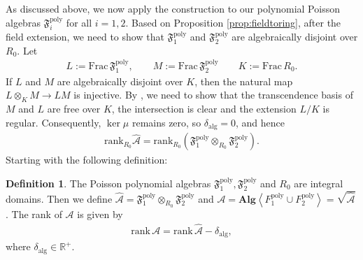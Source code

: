 \documentclass[11pt]{amsart}
\theoremstyle{definition}
\newtheorem{definition}[theorem]{Definition}
\theoremstyle{plain}
\theoremstyle{conclusion}
\begin{document}
  As discussed above, we now apply the construction to our polynomial Poisson algebras $\mathfrak{F}_i^{\mathrm{poly}}$ for all $i = 1,2$. Based on Proposition \ref{prop:fieldtoring}, after the field extension, we need to show that %
$\mathfrak{F}_1^{\mathrm{poly}}$ and $\mathfrak{F}_2^{\mathrm{poly}}$ are algebraically disjoint over $R_0$. %
Let \begin{align*}
L:=\mathrm{Frac}\,\mathfrak{F}_1^{\mathrm{poly}},\qquad M:=\mathrm{Frac}\,\mathfrak{F}_2^{\mathrm{poly}}\qquad K:= \mathrm{Frac}\,R_0.
\end{align*} If $L$ and $M$ are algebraically disjoint over $K$, then the natural map $L\otimes_K M \longrightarrow LM$ is injective. By \cite[Ch. VIII, \S3-\S4]{LangAlgebra}, we need to show that the transcendence basis of $M$ and $L$ are free over $K$, the intersection is clear and the extension $L/K$ is regular. Consequently, $\ker \mu$ remains zero,  so $\delta_{\mathrm{alg}}=0$, and hence\begin{align*}
\mathrm{rank}_{R_0}\widehat{\mathcal{A}}=\mathrm{rank}_{R_0} \left(\mathfrak{F}_1^{\mathrm{poly}}\otimes_{R_0}\mathfrak{F}_2^{\mathrm{poly}}\right).
\end{align*} Starting with the following definition:  \begin{definition}
 The Poisson polynomial algebras $\mathfrak{F}_1^{\mathrm{poly}},\mathfrak{F}_2^{\mathrm{poly}}$ and $R_0$ are integral domains. Then we define $\widehat{\mathcal{A}} = \mathfrak{F}_1^{\mathrm{poly}}\otimes_{R_0}\mathfrak{F}_2^{\mathrm{poly}}$ and $\mathcal{A} =  \textbf{Alg} \left\langle F_1^{\mathrm{poly}} \cup F_2^{\mathrm{poly}} \right \rangle= \sqrt{\widehat{\mathcal{A}}}$. The rank of $\mathcal{A}$ is given by \begin{align*}
\mathrm{rank}\, \mathcal{A} = \mathrm{rank}\,  \widehat{\mathcal{A}}  - \delta_{\mathrm{alg}},
 \end{align*} where $\delta_{\mathrm{alg}} \in \mathbb{R}^+$.
\end{definition}
 
\end{document}
